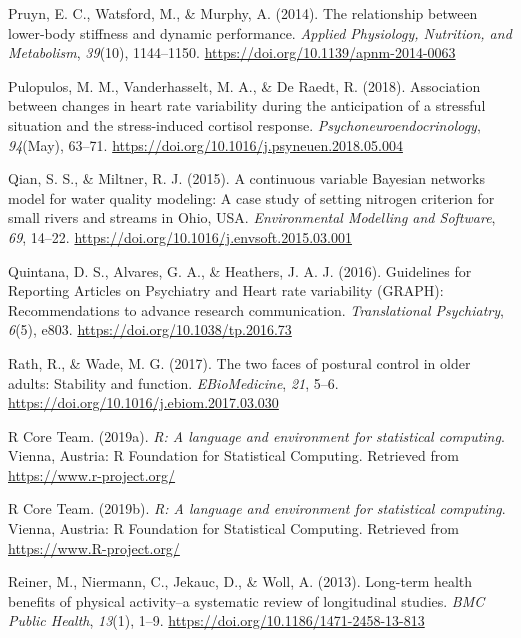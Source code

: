 \documentclass[
  english,
  man,floatsintext]{apa6}
\begin{document}
\leavevmode\hypertarget{ref-Pruyn2014}{}%
Pruyn, E. C., Watsford, M., \& Murphy, A. (2014). The relationship between lower-body stiffness and dynamic performance. \emph{Applied Physiology, Nutrition, and Metabolism}, \emph{39}(10), 1144--1150. \url{https://doi.org/10.1139/apnm-2014-0063}

\leavevmode\hypertarget{ref-Pulopulos2018}{}%
Pulopulos, M. M., Vanderhasselt, M. A., \& De Raedt, R. (2018). Association between changes in heart rate variability during the anticipation of a stressful situation and the stress-induced cortisol response. \emph{Psychoneuroendocrinology}, \emph{94}(May), 63--71. \url{https://doi.org/10.1016/j.psyneuen.2018.05.004}

\leavevmode\hypertarget{ref-Qian2015}{}%
Qian, S. S., \& Miltner, R. J. (2015). A continuous variable Bayesian networks model for water quality modeling: A case study of setting nitrogen criterion for small rivers and streams in Ohio, USA. \emph{Environmental Modelling and Software}, \emph{69}, 14--22. \url{https://doi.org/10.1016/j.envsoft.2015.03.001}

\leavevmode\hypertarget{ref-Quintana2016a}{}%
Quintana, D. S., Alvares, G. A., \& Heathers, J. A. J. (2016). Guidelines for Reporting Articles on Psychiatry and Heart rate variability (GRAPH): Recommendations to advance research communication. \emph{Translational Psychiatry}, \emph{6}(5), e803. \url{https://doi.org/10.1038/tp.2016.73}

\leavevmode\hypertarget{ref-Rath2017}{}%
Rath, R., \& Wade, M. G. (2017). The two faces of postural control in older adults: Stability and function. \emph{EBioMedicine}, \emph{21}, 5--6. \url{https://doi.org/10.1016/j.ebiom.2017.03.030}

\leavevmode\hypertarget{ref-RCoreTeam2019}{}%
R Core Team. (2019a). \emph{R: A language and environment for statistical computing}. Vienna, Austria: R Foundation for Statistical Computing. Retrieved from \url{https://www.r-project.org/}

\leavevmode\hypertarget{ref-R-base}{}%
R Core Team. (2019b). \emph{R: A language and environment for statistical computing}. Vienna, Austria: R Foundation for Statistical Computing. Retrieved from \url{https://www.R-project.org/}

\leavevmode\hypertarget{ref-Reiner2013}{}%
Reiner, M., Niermann, C., Jekauc, D., \& Woll, A. (2013). Long-term health benefits of physical activity--a systematic review of longitudinal studies. \emph{BMC Public Health}, \emph{13}(1), 1--9. \url{https://doi.org/10.1186/1471-2458-13-813}
\end{document}
